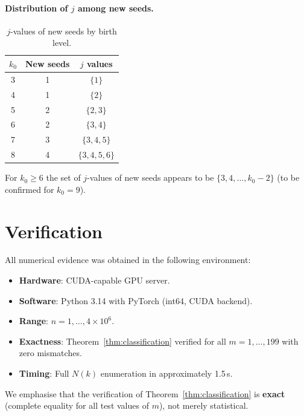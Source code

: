 \documentclass[twocolumn,a4paper,10pt]{article}
\begin{document}
\paragraph{Distribution of $j$ among new seeds.}

\begin{table}[h]
\centering
\small
\caption{$j$-values of new seeds by birth level.}
\label{tab:jdist}
\begin{tabular}{ccc}
\toprule
$k_0$ & New seeds & $j$ values \\
\midrule
3 & 1 & $\{1\}$ \\
4 & 1 & $\{2\}$ \\
5 & 2 & $\{2,3\}$ \\
6 & 2 & $\{3,4\}$ \\
7 & 3 & $\{3,4,5\}$ \\
8 & 4 & $\{3,4,5,6\}$ \\
\bottomrule
\end{tabular}
\end{table}

For $k_0 \geq 6$ the set of $j$-values of new seeds appears to be
$\{3, 4, \ldots, k_0 - 2\}$ (to be confirmed for $k_0 = 9$).

\section{Verification}

All numerical evidence was obtained in the following environment:
\begin{itemize}\itemsep0pt
  \item \textbf{Hardware}: CUDA-capable GPU server.
  \item \textbf{Software}: Python 3.14 with PyTorch (int64, CUDA backend).
  \item \textbf{Range}: $n = 1, \ldots, 4 \times 10^6$.
  \item \textbf{Exactness}: Theorem~\ref{thm:classification} verified for
        all $m = 1, \ldots, 199$ with zero mismatches.
  \item \textbf{Timing}: Full $N(k)$ enumeration in approximately 1.5\,s.
\end{itemize}

We emphasise that the verification of Theorem~\ref{thm:classification}
is \textbf{exact} (complete equality for all test values of $m$),
not merely statistical.
\end{document}
